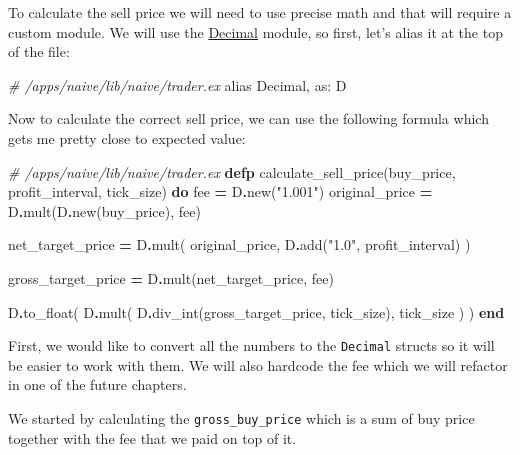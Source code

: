 \documentclass[
]{book}
\newenvironment{Shaded}{\begin{snugshade}}{\end{snugshade}}
\newcommand{\CommentTok}[1]{\textcolor[rgb]{0.56,0.35,0.01}{\textit{#1}}}
\newcommand{\ConstantTok}[1]{\textcolor[rgb]{0.00,0.00,0.00}{#1}}
\newcommand{\ImportTok}[1]{#1}
\newcommand{\KeywordTok}[1]{\textcolor[rgb]{0.13,0.29,0.53}{\textbf{#1}}}
\newcommand{\NormalTok}[1]{#1}
\newcommand{\OperatorTok}[1]{\textcolor[rgb]{0.81,0.36,0.00}{\textbf{#1}}}
\newcommand{\StringTok}[1]{\textcolor[rgb]{0.31,0.60,0.02}{#1}}
\newcommand{\VariableTok}[1]{\textcolor[rgb]{0.00,0.00,0.00}{#1}}
\begin{document}
To calculate the sell price we will need to use precise math and that will require a custom module. We will use the \href{https://github.com/ericmj/decimal}{Decimal} module, so first, let's alias it at the top of the file:

\begin{Shaded}
\begin{Highlighting}[]
\CommentTok{\# /apps/naive/lib/naive/trader.ex}
\ImportTok{alias} \ConstantTok{Decimal}\NormalTok{, }\VariableTok{as:}\NormalTok{ D}
\end{Highlighting}
\end{Shaded}

Now to calculate the correct sell price, we can use the following formula which gets me pretty close to expected value:

\begin{Shaded}
\begin{Highlighting}[]
  \CommentTok{\# /apps/naive/lib/naive/trader.ex}
  \KeywordTok{defp}\NormalTok{ calculate\_sell\_price(buy\_price, profit\_interval, tick\_size) }\KeywordTok{do}
\NormalTok{    fee }\OperatorTok{=}\NormalTok{ D}\OperatorTok{.}\NormalTok{new(}\StringTok{"1.001"}\NormalTok{)}
\NormalTok{    original\_price }\OperatorTok{=}\NormalTok{ D}\OperatorTok{.}\NormalTok{mult(D}\OperatorTok{.}\NormalTok{new(buy\_price), fee)}

\NormalTok{    net\_target\_price }\OperatorTok{=}
\NormalTok{      D}\OperatorTok{.}\NormalTok{mult(}
\NormalTok{        original\_price,}
\NormalTok{        D}\OperatorTok{.}\NormalTok{add(}\StringTok{"1.0"}\NormalTok{, profit\_interval)}
\NormalTok{      )}

\NormalTok{    gross\_target\_price }\OperatorTok{=}\NormalTok{ D}\OperatorTok{.}\NormalTok{mult(net\_target\_price, fee)}

\NormalTok{    D}\OperatorTok{.}\NormalTok{to\_float(}
\NormalTok{      D}\OperatorTok{.}\NormalTok{mult(}
\NormalTok{        D}\OperatorTok{.}\NormalTok{div\_int(gross\_target\_price, tick\_size),}
\NormalTok{        tick\_size}
\NormalTok{      )}
\NormalTok{    )}
  \KeywordTok{end}
\end{Highlighting}
\end{Shaded}

First, we would like to convert all the numbers to the \texttt{Decimal} structs so it will be easier to work with them. We will also hardcode the fee which we will refactor in one of the future chapters.

We started by calculating the \texttt{gross\_buy\_price} which is a sum of buy
price together with the fee that we paid on top of it.
\end{document}
